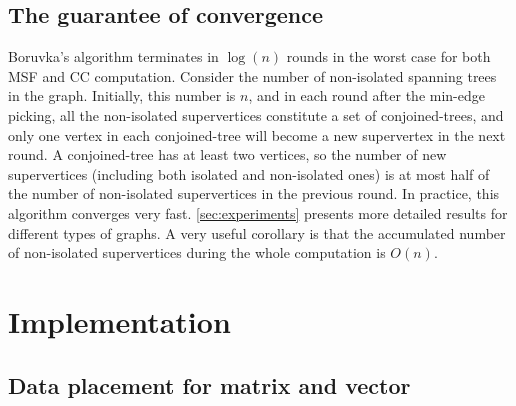 \documentclass{sokendai_thesis} %
\newcommand{\boruvka}[0]{Boruvka}
\begin{document}
\subsection{The guarantee of convergence}
\label{sec:convergence}

\boruvka{}'s algorithm terminates in $\log(n)$ rounds in the worst case for both MSF and CC computation.
Consider the number of non-isolated spanning trees in the graph.
Initially, this number is $n$, and in each round after the min-edge picking, all the non-isolated supervertices constitute a set of conjoined-trees, and only one vertex in each conjoined-tree will become a new supervertex in the next round.
A conjoined-tree has at least two vertices, so the number of new supervertices (including both isolated and non-isolated ones) is at most half of the number of non-isolated supervertices in the previous round.
In practice, this algorithm converges very fast.
\autoref{sec:experiments} presents more detailed results for different types of graphs.
A very useful corollary is that the accumulated number of non-isolated supervertices during the whole computation is $O(n)$.

\section{Implementation}





\subsection{Data placement for matrix and vector}
\label{sec:basic-op}
\end{document}
